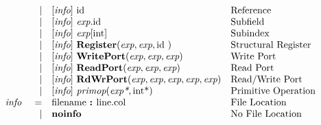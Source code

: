 \documentclass[10pt]{article}
\begin{document}
\[\begin{array}{rrll}
                &\vert &[\text{\em info}]\  \text{id }                                                                     &\text{Reference}\\
                &\vert &[\text{\em info}]\  \text{\em exp}.\text{id }                                                           &\text{Subfield}\\
                &\vert &[\text{\em info}]\  \text{\em exp}[\text{int}]                                                        &\text{Subindex}\\
                &\vert &[\text{\em info}]\  \text{\bf Register}(\text{\em exp}, \text{\em exp}, \text{id })                               &\text{Structural Register}\\
                &\vert &[\text{\em info}]\  \text{\bf WritePort}(\text{\em exp}, \text{\em exp}, \text{\em exp})                        &\text{Write Port}\\
                &\vert &[\text{\em info}]\  \text{\bf ReadPort}(\text{\em exp}, \text{\em exp}, \text{\em exp})                         &\text{Read Port}\\
                &\vert &[\text{\em info}]\  \text{\bf RdWrPort}(\text{\em exp}, \text{\em exp}, \text{\em exp}, \text{\em exp}, \text{\em exp})   &\text{Read/Write Port}\\
                &\vert &[\text{\em info}]\  \text{\em primop}(\text{\em exp*}, \text{int}\text{*})                                 &\text{Primitive Operation}\\
\text{\em info\ }       &=     &\text{filename } \text{\bf :\ } \text{line} . \text{col}                              &\text{File Location}\\
                &\vert &\text{\bf noinfo\ }                                                                   &\text{No File Location}\\
\end{array}
\]
\end{document}
